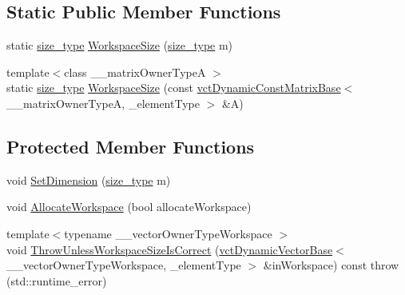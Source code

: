 \subsection*{Static Public Member Functions}
\begin{DoxyCompactItemize}
\item 
static \hyperlink{classnmr_is_orthonormal_dynamic_data_ae69581f9b270b49b1cd1d16ff29a5409}{size\-\_\-type} \hyperlink{classnmr_is_orthonormal_dynamic_data_aca18c8dd979e271e79ead883924a7e83}{Workspace\-Size} (\hyperlink{classnmr_is_orthonormal_dynamic_data_ae69581f9b270b49b1cd1d16ff29a5409}{size\-\_\-type} m)
\item 
{\footnotesize template$<$class \-\_\-\-\_\-matrix\-Owner\-Type\-A $>$ }\\static \hyperlink{classnmr_is_orthonormal_dynamic_data_ae69581f9b270b49b1cd1d16ff29a5409}{size\-\_\-type} \hyperlink{classnmr_is_orthonormal_dynamic_data_ab0932c2c04e3aa52ac6c6c57d7ebc6c3}{Workspace\-Size} (const \hyperlink{classvct_dynamic_const_matrix_base}{vct\-Dynamic\-Const\-Matrix\-Base}$<$ \-\_\-\-\_\-matrix\-Owner\-Type\-A, \-\_\-element\-Type $>$ \&A)
\end{DoxyCompactItemize}
\subsection*{Protected Member Functions}
\begin{DoxyCompactItemize}
\item 
void \hyperlink{classnmr_is_orthonormal_dynamic_data_aea3e1beee7488198722fe5413d7ad0a6}{Set\-Dimension} (\hyperlink{classnmr_is_orthonormal_dynamic_data_ae69581f9b270b49b1cd1d16ff29a5409}{size\-\_\-type} m)
\item 
void \hyperlink{classnmr_is_orthonormal_dynamic_data_a2247837026319eccc2b41aa2be968535}{Allocate\-Workspace} (bool allocate\-Workspace)
\item 
{\footnotesize template$<$typename \-\_\-\-\_\-vector\-Owner\-Type\-Workspace $>$ }\\void \hyperlink{classnmr_is_orthonormal_dynamic_data_af2d92ae79e88513e7b9eab8b343c70e2}{Throw\-Unless\-Workspace\-Size\-Is\-Correct} (\hyperlink{classvct_dynamic_vector_base}{vct\-Dynamic\-Vector\-Base}$<$ \-\_\-\-\_\-vector\-Owner\-Type\-Workspace, \-\_\-element\-Type $>$ \&in\-Workspace) const   throw (std\-::runtime\-\_\-error)
\end{DoxyCompactItemize}
